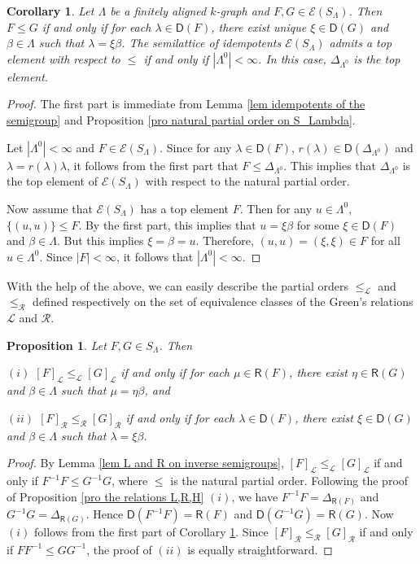 \documentclass[a4paper,reqno,11pt]{amsart}
\numberwithin{equation}{section}
\newtheorem{cor}[thm]{Corollary}
\newtheorem{prop}[thm]{Proposition}
\theoremstyle{definition}
\theoremstyle{remark}
\begin{document}
\begin{cor}\label{cor partial order on semilattice}
Let $\Lambda$ be a finitely aligned $k$-graph and $F,G\in \mathcal{E}(S_\Lambda)$. Then $F\le G$ if and only if for each $\lambda\in \mathsf{D}(F)$, there exist unique $\xi\in \mathsf{D}(G)$ and $\beta\in \Lambda$ such that $\lambda=\xi\beta$. The semilattice of idempotents $\mathcal{E}(S_\Lambda)$ admits a top element with respect to $\le$ if and only if $|\Lambda^0|<\infty$. In this case, $\Delta_{\Lambda^0}$ is the top element.
\end{cor}
\begin{proof}
The first part is immediate from Lemma \ref{lem idempotents of the semigroup} and Proposition \ref{pro natural partial order on S_Lambda}. 

Let $|\Lambda^0|<\infty$ and $F\in \mathcal{E}(S_\Lambda)$. Since for any $\lambda\in \mathsf{D}(F)$, $r(\lambda)\in \mathsf{D}(\Delta_{\Lambda^0})$ and $\lambda=r(\lambda)\lambda$, it follows from the first part that $F\le \Delta_{\Lambda^0}$. This implies that $\Delta_{\Lambda^0}$ is the top element of $\mathcal{E}(S_\Lambda)$ with respect to the natural partial order. 

Now assume that $\mathcal{E}(S_\Lambda)$ has a top element $F$. Then for any $u\in \Lambda^0$, $\{(u,u)\}\le F$. By the first part, this implies that $u=\xi\beta$ for some $\xi\in \mathsf{D}(F)$ and $\beta\in \Lambda$. But this implies $\xi=\beta=u$. Therefore, $(u,u)=(\xi,\xi)\in F$ for all $u\in \Lambda^0$. Since $|F|<\infty$, it follows that $|\Lambda^0|<\infty$. 
\end{proof}
With the help of the above, we can easily describe the partial orders $\le_{\mathscr{L}}$ and $\le_{\mathscr{R}}$ defined respectively on the set of equivalence classes of the Green's relations $\mathscr{L}$ and $\mathscr{R}$. 
\begin{prop}\label{pro partial orders on equivalence classes L,R}
Let $F,G\in S_\Lambda$. Then

$(i)$ $[F]_{\mathscr{L}}\le_{\mathscr{L}} [G]_{\mathscr{L}}$ if and only if for each $\mu\in \mathsf{R}(F)$, there exist $\eta\in \mathsf{R}(G)$ and $\beta\in \Lambda$ such that $\mu=\eta\beta$, and

$(ii)$ $[F]_{\mathscr{R}}\le_{\mathscr{R}} [G]_{\mathscr{R}}$ if and only if for each $\lambda\in \mathsf{D}(F)$, there exist $\xi\in \mathsf{D}(G)$ and $\beta\in \Lambda$ such that $\lambda=\xi\beta$.
\end{prop}
\begin{proof}
By Lemma \ref{lem L and R on inverse semigroups}, $[F]_{\mathscr{L}}\le_{\mathscr{L}} [G]_{\mathscr{L}}$ if and only if $F^{-1}F\le G^{-1}G$, where $\le$ is the natural partial order. Following the proof of Proposition \ref{pro the relations L,R,H} $(i)$, we have $F^{-1}F=\Delta_{\mathsf{R}(F)}$ and $G^{-1}G=\Delta_{\mathsf{R}(G)}$. Hence $\mathsf{D}(F^{-1}F)=\mathsf{R}(F)$ and $\mathsf{D}(G^{-1}G)=\mathsf{R}(G)$. Now $(i)$ follows from the first part of Corollary \ref{cor partial order on semilattice}. Since $[F]_{\mathscr{R}}\le_{\mathscr{R}} [G]_{\mathscr{R}}$ if and only if $FF^{-1}\le GG^{-1}$, the proof of $(ii)$ is equally straightforward.
\end{proof}
\end{document}
